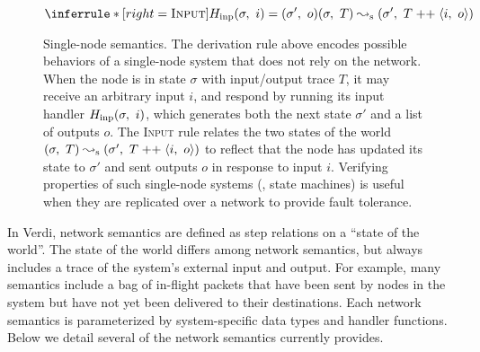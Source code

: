 \begin{figure}[t]
  \centering

  \begin{footnotesize} \begin{spacing}{1.5} \[
    \inferrule*[right=\textsc{Input}]{
      \fHinp(\sigma,\ i) = (\sigma',\ o)
    }{
      (\sigma,\ T) \fsmstep (\sigma',\ T \appop \traceelt{i,\ o})
    }
  \] \end{spacing} \end{footnotesize}

  \caption{Single-node semantics.
  The derivation rule above encodes possible behaviors of a single-node
  system that does not rely on the network.
  When the node is in state $\sigma$ with input/output trace $T$, it may
  receive an arbitrary input $i$, and respond by running its input handler
  $H_{\mathrm{inp}}(\sigma,\ i)$, which generates both the next state $\sigma'$ and a list of
  outputs $o$.
  The \textsc{Input} rule relates the two states of the world $(\sigma,\ T) \leadsto_{\mathrm{s}}
  (\sigma',\ T \;{\text{++}}\; \langle i,\ o \rangle)$ to reflect that the node has updated
  its state to $\sigma'$ and sent outputs $o$ in response to input $i$.
  Verifying properties of such single-node systems (\ie, state machines) is
useful when they are replicated over a network to provide fault tolerance.}

\label{fig:state-machine-semantics}
\end{figure}

In Verdi, network semantics are defined as step relations on a ``state of
the world''.
%
The state of the world differs among network semantics, but always includes
a trace of the system's external input and output.
%
For example, many semantics include a bag of in-flight packets
that have been sent by nodes in the system but have not yet been delivered
to their destinations.
%
Each network semantics is parameterized by system-specific data types and
handler functions.
%
Below we detail several of the network semantics \Verdi currently provides.

